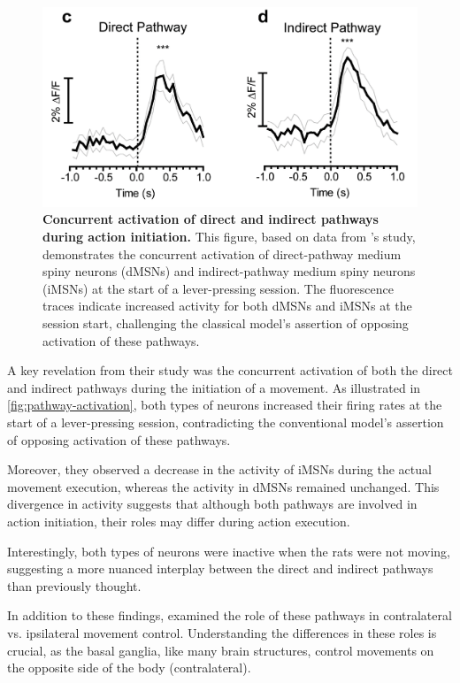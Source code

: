 \documentclass[10pt]{article}
\begin{document}
\begin{sloppypar}
  \begin{figure}[ht]
    \centering
    \includegraphics[width=\textwidth]{figures/direct-indirect-activation.png}
    \caption[Concurrent activation of direct and indirect pathways during action initiation]{\textbf{Concurrent activation of direct and indirect pathways during action initiation.} This figure, based on data from \cite{cui_concurrent_2013} ’s study, demonstrates the concurrent activation of direct-pathway medium spiny neurons (dMSNs) and indirect-pathway medium spiny neurons (iMSNs) at the start of a lever-pressing session. The fluorescence traces indicate increased activity for both dMSNs and iMSNs at the session start, challenging the classical model’s assertion of opposing activation of these pathways.}
    \label{fig:pathway-activation}
  \end{figure}

  A key revelation from their study was the concurrent activation of both the direct and indirect pathways during the initiation of a movement. As illustrated in \autoref{fig:pathway-activation}, both types of neurons increased their firing rates at the start of a lever-pressing session, contradicting the conventional model’s assertion of opposing activation of these pathways.

  Moreover, they observed a decrease in the activity of iMSNs during the actual movement execution, whereas the activity in dMSNs remained unchanged. This divergence in activity suggests that although both pathways are involved in action initiation, their roles may differ during action execution.

  Interestingly, both types of neurons were inactive when the rats were not moving, suggesting a more nuanced interplay between the direct and indirect pathways than previously thought.

  In addition to these findings, \cite{cui_concurrent_2013} examined the role of these pathways in contralateral vs. ipsilateral movement control. Understanding the differences in these roles is crucial, as the basal ganglia, like many brain structures, control movements on the opposite side of the body (contralateral).


\end{sloppypar}
\end{document}
